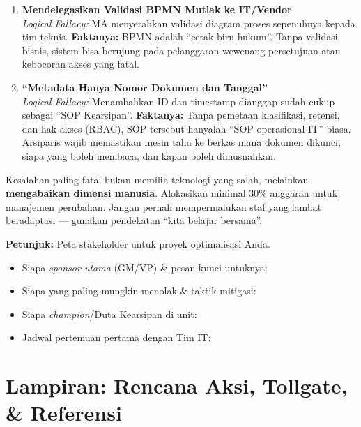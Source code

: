 \documentclass[11pt,a4paper]{article}
\begin{document}
\begin{enumerate}
    \item \textbf{Mendelegasikan Validasi BPMN Mutlak ke IT/Vendor} \\ 
    \textit{Logical Fallacy:} MA menyerahkan validasi diagram proses sepenuhnya kepada tim teknis. \textbf{Faktanya:} BPMN adalah ``cetak biru hukum''. Tanpa validasi bisnis, sistem bisa berujung pada pelanggaran wewenang persetujuan atau kebocoran akses yang fatal.
    
    \item \textbf{``Metadata Hanya Nomor Dokumen dan Tanggal''} \\ 
    \textit{Logical Fallacy:} Menambahkan ID dan timestamp dianggap sudah cukup sebagai ``SOP Kearsipan''. \textbf{Faktanya:} Tanpa pemetaan klasifikasi, retensi, dan hak akses (RBAC), SOP tersebut hanyalah ``SOP operasional IT'' biasa. Arsiparis wajib memastikan mesin tahu ke berkas mana dokumen dikunci, siapa yang boleh membaca, dan kapan boleh dimusnahkan.
\end{enumerate}

\begin{warnbox}
Kesalahan paling fatal bukan memilih teknologi yang salah, melainkan \textbf{mengabaikan dimensi manusia}. Alokasikan minimal 30\% anggaran untuk manajemen perubahan. Jangan pernah mempermalukan staf yang lambat beradaptasi --- gunakan pendekatan ``kita belajar bersama''.
\end{warnbox}

\begin{notesbox}
\small
\textbf{Petunjuk:} Peta stakeholder untuk proyek optimalisasi Anda.
\begin{itemize}[nosep, leftmargin=*]
    \item Siapa \textit{sponsor utama} (GM/VP) \& pesan kunci untuknya:
    \item Siapa yang paling mungkin menolak \& taktik mitigasi:
    \item Siapa \textit{champion}/Duta Kearsipan di unit:
    \item Jadwal pertemuan pertama dengan Tim IT:
\end{itemize}
\vspace{1cm}
\end{notesbox}

\newpage

\section{Lampiran: Rencana Aksi, Tollgate, \& Referensi}
\end{document}
